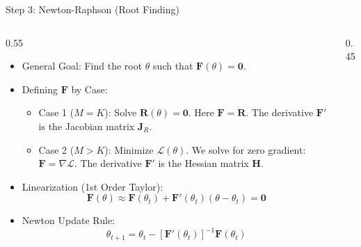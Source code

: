 \documentclass[aspectratio=169]{beamer}
\newcommand{\1}{\mathbf{1}}
\begin{document}
    
\begin{frame}{Step 3: Newton-Raphson (Root Finding)}
    \begin{columns}
        \begin{column}{0.55\textwidth}
        \small
        \begin{itemize}
            \item General Goal: Find the root $\theta$ such that $\mathbf{F}(\theta) = \mathbf{0}$.
            
            \item Defining $\mathbf{F}$ by Case:
            \begin{itemize}
                \item Case 1 ($M=K$): Solve $\mathbf{R}(\theta) = \mathbf{0}$. Here $\mathbf{F} = \mathbf{R}$. The derivative $\mathbf{F}'$ is the Jacobian matrix $\mathbf{J}_R$.
                \item Case 2 ($M>K$): Minimize $\mathcal{L}(\theta)$. We solve for zero gradient: $\mathbf{F} = \nabla \mathcal{L}$. The derivative $\mathbf{F}'$ is the Hessian matrix $\mathbf{H}$.
            \end{itemize}
            
            \item Linearization (1st Order Taylor):
            $$ \mathbf{F}(\theta) \approx \mathbf{F}(\theta_t) + \mathbf{F}'(\theta_t)(\theta - \theta_t) = \mathbf{0} $$
            
            \item Newton Update Rule:
            $$ \theta_{t+1} = \theta_t - [\mathbf{F}'(\theta_t)]^{-1} \mathbf{F}(\theta_t) $$
            
       \end{itemize}
        \end{column}
        \begin{column}{0.45\textwidth}
            \centering
\end{column}
\end{columns}
\end{frame}
\end{document}
